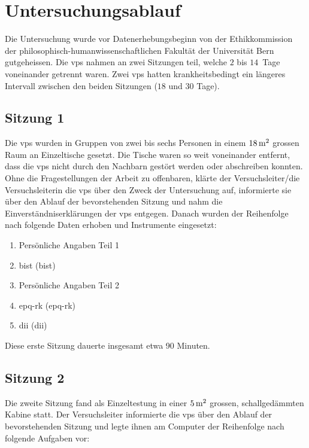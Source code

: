 \documentclass[11pt, twoside, a4paper]{book}		%
\begin{document}
\section{Untersuchungsablauf \label{sec:Versuchsablauf}}

Die Untersuchung wurde vor Datenerhebungsbeginn von der Ethikkommission der philosophisch-humanwissenschaftlichen Fakultät der Universität Bern gutgeheissen. Die \glspl{vp} nahmen an zwei Sitzungen teil, welche $2$ bis $14$~Tage voneinander getrennt waren. Zwei \glspl{vp} hatten krankheitsbedingt ein längeres Intervall zwischen den beiden Sitzungen ($18$ und $30$ Tage).

\subsection{Sitzung 1}

Die \glspl{vp} wurden in Gruppen von zwei bis sechs Personen in einem $18\,\textnormal{m}^2$ grossen Raum an Einzeltische gesetzt. Die Tische waren so weit voneinander entfernt, dass die \glspl{vp} nicht durch den Nachbarn gestört werden oder abschreiben konnten. 
Ohne die Fragestellungen der Arbeit zu offenbaren, klärte der Versuchsleiter/die Versuchsleiterin die \glspl{vp} über den Zweck der Untersuchung auf, informierte sie über den Ablauf der bevorstehenden Sitzung und nahm die Einverständniserklärungen der \glspl{vp} entgegen. Danach wurden der Reihenfolge nach folgende Daten erhoben und Instrumente eingesetzt:

\begin{enumerate}
	\item Persönliche Angaben Teil 1
	\item \acrlong{bist} (\gls{bist})
	\item Persönliche Angaben Teil 2
	\item \acrlong{epq-rk} (\gls{epq-rk})
	\item \acrlong{dii} (\gls{dii})
\end{enumerate}

\noindent Diese erste Sitzung dauerte insgesamt etwa 90 Minuten.

\subsection{Sitzung 2}
Die zweite Sitzung fand als Einzeltestung in einer $5\,\textnormal{m}^2$ grossen, schallgedämmten Kabine statt. 
Der Versuchsleiter informierte die \glspl{vp} über den Ablauf der bevorstehenden Sitzung und legte ihnen am Computer der Reihenfolge nach folgende Aufgaben vor:
\end{document}
